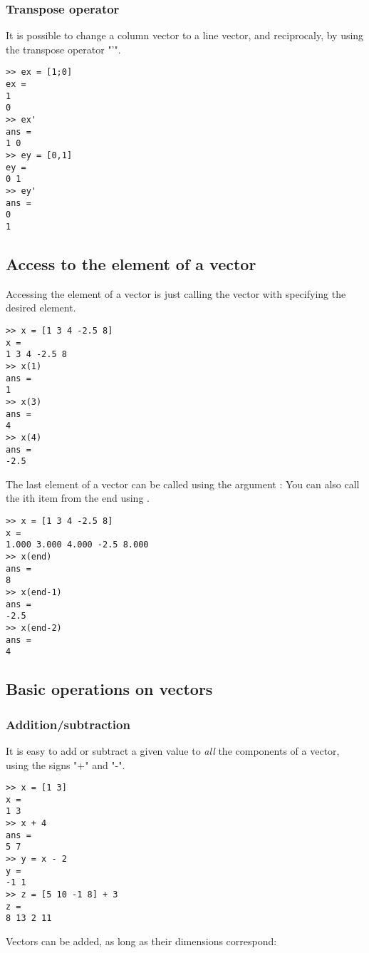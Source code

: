 \subsubsection{Transpose operator}
It is possible to change a column vector to a line vector, and reciprocaly, by using the transpose operator "'".
\begin{lstlisting}
>> ex = [1;0]
ex =
1
0
>> ex'
ans =
1 0
>> ey = [0,1]
ey =
0 1
>> ey'
ans =
0
1
\end{lstlisting}


\subsection{Access to the element of a vector}
Accessing the element of a vector is just calling the vector with specifying the desired element.

\begin{lstlisting}
>> x = [1 3 4 -2.5 8]
x = 
1 3 4 -2.5 8
>> x(1)
ans = 
1
>> x(3)
ans = 
4
>> x(4)
ans = 
-2.5
\end{lstlisting}




The last element of a vector can be called using the argument :
You can also call the ith item from the end using . 
\begin{lstlisting}
>> x = [1 3 4 -2.5 8]
x = 
1.000 3.000 4.000 -2.5 8.000
>> x(end)
ans = 
8
>> x(end-1)
ans = 
-2.5
>> x(end-2)
ans = 
4
\end{lstlisting}





\subsection{Basic operations on vectors}
\subsubsection{Addition/subtraction}
It is easy to add or subtract a given value to \emph{all} the components of a vector, using the signs "+" and "-".

\begin{lstlisting}
>> x = [1 3]
x = 
1 3
>> x + 4
ans =
5 7
>> y = x - 2
y =
-1 1
>> z = [5 10 -1 8] + 3
z = 
8 13 2 11
\end{lstlisting}


Vectors can be added, as long as their dimensions correspond:

